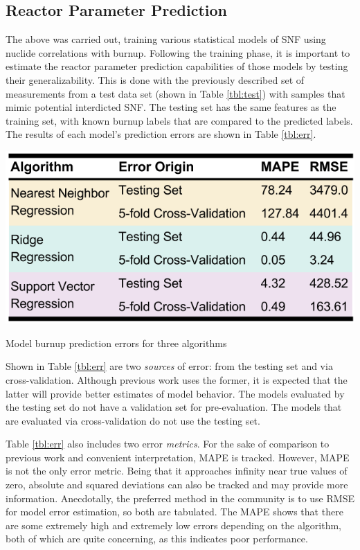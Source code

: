 \subsection{Reactor Parameter Prediction}
\label{sec:rxtrparam}

The above was carried out, training various statistical models of \gls{SNF}
using nuclide correlations with burnup.  Following the training phase, it is
important to estimate the reactor parameter prediction capabilities of those
models by testing their generalizability.  This is done with the previously
described set of measurements from a test data set (shown in Table
\ref{tbl:test}) with samples that mimic potential interdicted \gls{SNF}. The
testing set has the same features as the training set, with known burnup labels
that are compared to the predicted labels. The results of each model's
prediction errors are shown in Table \ref{tbl:err}. 

\begin{table}[!htb]
  \centering
  \includegraphics[width=0.8\linewidth]{./chapters/demo_method/err.png}
  \caption{Model burnup prediction errors for three algorithms}
  \label{tbl:err}
\end{table}

Shown in Table \ref{tbl:err} are two \textit{sources} of error: from the
testing set and via cross-validation.  Although previous work uses the former,
it is expected that the latter will provide better estimates of model behavior.
The models evaluated by the testing set do not have a validation set for
pre-evaluation.  The models that are evaluated via cross-validation do not use
the testing set. 

Table \ref{tbl:err} also includes two error \textit{metrics}.  For the sake of
comparison to previous work and convenient interpretation, \gls{MAPE} is
tracked. However, \gls{MAPE} is not the only error metric. Being that it
approaches infinity near true values of zero, absolute and squared deviations
can also be tracked and may provide more information.  Anecdotally, the
preferred method in the community is to use \gls{RMSE} for model error
estimation, so both are tabulated.  The \gls{MAPE} shows that there are some
extremely high and extremely low errors depending on the algorithm, both of
which are quite concerning, as this indicates poor performance. 

